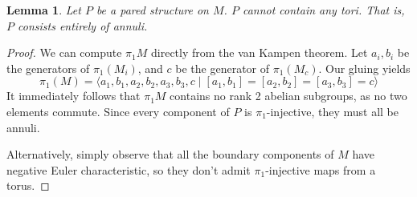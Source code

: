 \documentclass[12pt]{amsart}
\newtheorem{lemma}[theorem]{Lemma}
\theoremstyle{definition}
\theoremstyle{remark}
\begin{document}
\begin{lemma}

Let $P$ be a pared structure on $M$. $P$ cannot contain any tori. That is,
$P$ consists entirely of annuli.

\end{lemma}
\begin{proof}

We can compute $\pi_1M$ directly from the van Kampen theorem. Let $a_i,b_i$ be
the generators of $\pi_1(M_i)$, and $c$ be the generator of $\pi_1(M_c)$. Our
gluing yields
\[
\pi_1(M) = \langle a_1,b_1,a_2,b_2,a_3,b_3,c \mid
[a_1,b_1]=[a_2,b_2]=[a_3,b_3]=c \rangle
\]
It immediately follows that $\pi_1M$ contains no rank 2 abelian subgroups, as
no two elements commute. Since every component of $P$ is $\pi_1$-injective,
they must all be annuli.

Alternatively, simply observe that all the boundary components of $M$ have
negative Euler characteristic, so they don't admit $\pi_1$-injective maps from
a torus.

\end{proof}
\end{document}
